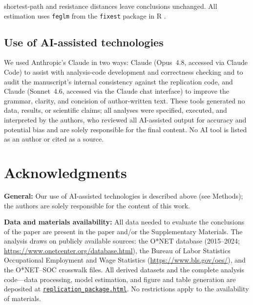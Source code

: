 \documentclass[11pt, letterpaper]{article} %
\newcommand{\parencite}[1]{\cite{#1}}
\begin{document}
shortest-path and resistance distances leave conclusions unchanged. All estimation uses \texttt{feglm} from the \texttt{fixest} package in R \parencite{berge_fixest_2025}.

\subsection*{Use of AI-assisted technologies}

We used Anthropic's Claude in two ways: Claude (Opus~4.8, accessed via Claude Code) to assist with analysis-code development and correctness checking and to audit the manuscript's internal consistency against the replication code, and Claude (Sonnet~4.6, accessed via the Claude chat interface) to improve the grammar, clarity, and concision of author-written text. These tools generated no data, results, or scientific claims; all analyses were specified, executed, and interpreted by the authors, who reviewed all AI-assisted output for accuracy and potential bias and are solely responsible for the final content. No AI tool is listed as an author or cited as a source.


\section*{Acknowledgments}

\textbf{General:} Our use of AI-assisted technologies is described above (see Methods); the authors are solely responsible for the content of this work.




\textbf{Data and materials availability:} All data needed to evaluate the conclusions of the paper are present in the paper and/or the Supplementary Materials. The analysis draws on publicly available sources: the O*NET database (2015--2024; \url{https://www.onetcenter.org/database.html}), the Bureau of Labor Statistics Occupational Employment and Wage Statistics (\url{https://www.bls.gov/oes/}), and the O*NET--SOC crosswalk files. All derived datasets and the complete analysis code---data processing, model estimation, and figure and table generation are deposited at \href{https://anonymous.4open.science/r/skill_diffusion_replication-7857/README.md}{\nolinkurl{replication_package.html}}. No restrictions apply to the availability of materials.
\end{document}
